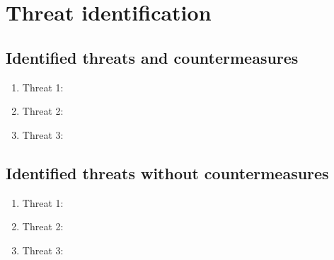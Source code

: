 \section{Threat identification}
\label{chapter3}

\subsection{Identified threats and countermeasures}


	\begin{enumerate}
		\item Threat 1: 
		\item Threat 2:
		\item Threat 3:
	\end{enumerate}
	
\subsection{Identified threats without countermeasures}

	\begin{enumerate}
		\item Threat 1: 
		\item Threat 2:
		\item Threat 3:
	\end{enumerate}